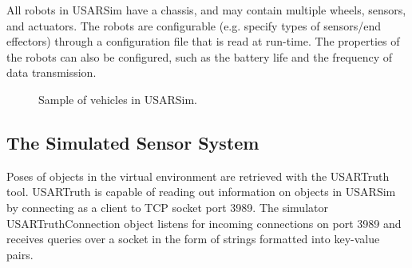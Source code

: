 All robots in USARSim have a chassis, and may contain multiple wheels, sensors, and
actuators. The robots are configurable (e.g. specify types of
sensors/end effectors) through a configuration file that is read at run-time. The properties of the robots can
also be configured, such as the battery life and the frequency of
data transmission.

\begin{figure}[t!]
\centering
{}\qquad
{}\qquad
{}\qquad
{}
\caption{Sample of vehicles in USARSim.}
\end{figure}

\subsection{The Simulated Sensor System}
\label{subsection:usartruth}
Poses of objects in the virtual environment are retrieved with the USARTruth tool. USARTruth is capable of reading out information on objects in USARSim by connecting as a client to TCP socket port 3989. The simulator USARTruthConnection object listens for incoming connections on port 3989 and receives queries over a socket in the form of strings formatted into key-value pairs.

